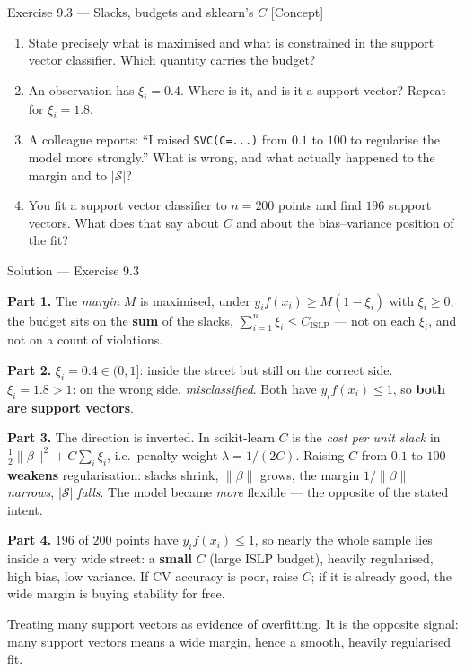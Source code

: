 \documentclass[aspectratio=169,11pt]{beamer}
\begin{document}
\begin{frame}{Exercise 9.3 --- Slacks, budgets and sklearn's $C$ [Concept]}
\begin{exercise}
  \begin{enumerate}
    \item State precisely what is maximised and what is constrained in the
          support vector classifier. Which quantity carries the budget?
    \item An observation has $\xi_i = 0.4$. Where is it, and is it a support
          vector? Repeat for $\xi_i = 1.8$.
    \item A colleague reports: ``I raised \texttt{SVC(C=...)} from $0.1$ to
          $100$ to regularise the model more strongly.'' What is wrong, and
          what actually happened to the margin and to $|\mathcal S|$?
    \item You fit a support vector classifier to $n=200$ points and find $196$
          support vectors. What does that say about $C$ and about the
          bias--variance position of the fit?
  \end{enumerate}
\end{exercise}
\end{frame}

\begin{frame}{Solution --- Exercise 9.3}
\begin{solutionbox}
  \scriptsize
  \textbf{Part 1.} The \emph{margin} $M$ is maximised, under
  $y_i f(x_i)\ge M(1-\xi_i)$ with $\xi_i\ge0$; the budget sits on the
  \textbf{sum} of the slacks, $\sum_{i=1}^n \xi_i \le C_{\text{ISLP}}$ --- not
  on each $\xi_i$, and not on a count of violations.

  \textbf{Part 2.} $\xi_i=0.4\in(0,1]$: inside the street but still on the
  correct side. $\xi_i=1.8>1$: on the wrong side, \emph{misclassified}. Both
  have $y_if(x_i)\le1$, so \textbf{both are support vectors}.

  \textbf{Part 3.} The direction is inverted. In scikit-learn $C$ is the
  \emph{cost per unit slack} in $\tfrac12\|\beta\|^2 + C\sum_i\xi_i$, i.e.\
  penalty weight $\lambda=1/(2C)$. Raising $C$ from $0.1$ to $100$
  \textbf{weakens} regularisation: slacks shrink, $\|\beta\|$ grows, the margin
  $1/\|\beta\|$ \emph{narrows}, $|\mathcal S|$ \emph{falls}. The model became
  \emph{more} flexible --- the opposite of the stated intent.

  \textbf{Part 4.} $196$ of $200$ points have $y_if(x_i)\le1$, so nearly the
  whole sample lies inside a very wide street: a \textbf{small} $C$ (large
  ISLP budget), heavily regularised, high bias, low variance. If CV accuracy is
  poor, raise $C$; if it is already good, the wide margin is buying stability
  for free.
\end{solutionbox}
\begin{mistake}
  Treating many support vectors as evidence of overfitting. It is the opposite
  signal: many support vectors means a wide margin, hence a smooth, heavily
  regularised fit.
\end{mistake}
\end{frame}
\end{document}
